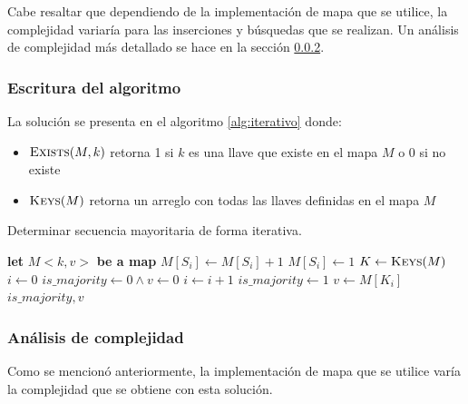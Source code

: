 \documentclass[letter]{article}
\begin{document}
Cabe resaltar que dependiendo de la implementación de mapa que se utilice, la complejidad variaría para las inserciones y búsquedas que se realizan. Un análisis de complejidad más detallado se hace en la sección \ref{algoritmos:iterativo:complejidad}. \par

\subsubsection{Escritura del algoritmo} \label{algoritmos:iterativo:algoritmo}

La solución se presenta en el algoritmo \ref{alg:iterativo} donde:

\begin{itemize}
    \item $\textsc{Exists}(M,k)$ retorna 1 si $k$ es una llave que existe en el mapa $M$ o 0 si no existe
    \item $\textsc{Keys}(M)$ retorna un arreglo con todas las llaves definidas en el mapa $M$
\end{itemize}

\newpage

\begin{algorithm}[!ht]
\caption{Determinar secuencia mayoritaria de forma iterativa.}
\label{alg:iterativo}
\begin{algorithmic}[1] 
    \State \textbf{let} $M<k,v>$ \textbf{be a map}
            \State $M[S_i] \leftarrow M[S_i] + 1$
        \Else
            \State $M[S_i] \leftarrow 1$
        \EndIf
    \EndFor
    \State $K \leftarrow \Call{Keys}{M}$
    \State $i \leftarrow 0$
    \State $is\_majority \leftarrow 0 \land v \leftarrow 0$
        \State $i \leftarrow i + 1$
            \State $is\_majority \leftarrow 1$
            \State $v \leftarrow M[K_i]$
        \EndIf
    \EndWhile
    \State \Return $is\_majority, v$
\EndProcedure
\end{algorithmic}
\end{algorithm}

\subsubsection{Análisis de complejidad} \label{algoritmos:iterativo:complejidad}

Como se mencionó anteriormente, la implementación de mapa que se utilice varía la complejidad que se obtiene con esta solución. \par
\end{document}
